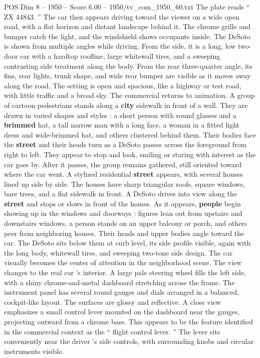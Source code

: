 \begin{textsample}{POS Dim 8 – 1950 – Score 6.00 – 1950/tv\_com\_1950\_60.txt}
The plate reads “ ZX 44843. ” The car then appears driving toward the viewer on a wide open road, with a flat horizon and distant landscape behind it.
The chrome grille and bumper catch the light, and the windshield shows occupants inside.
The DeSoto is shown from multiple angles while driving.
From the side, it is a long, low two-door car with a hardtop roofline, large whitewall tires, and a sweeping contrasting side treatment along the body.
From the rear three-quarter angle, its fins, rear lights, trunk shape, and wide rear bumper are visible as it moves away along the road.
The setting is open and spacious, like a highway or test road, with little traffic and a broad sky.
The commercial returns to animation.
A group of cartoon pedestrians stands along a \textbf{city} sidewalk in front of a wall.
They are drawn in varied shapes and styles : a short person with round glasses and a \textbf{brimmed} hat, a tall narrow man with a long face, a woman in a fitted light dress and wide-brimmed hat, and others clustered behind them.
Their bodies face the \textbf{street} and their heads turn as a DeSoto passes across the foreground from right to left.
They appear to stop and look, smiling or staring with interest as the car goes by.
After it passes, the group remains gathered, still oriented toward where the car went.
A stylized residential \textbf{street} appears, with several houses lined up side by side.
The houses have sharp triangular roofs, square windows, bare trees, and a flat sidewalk in front.
A DeSoto drives into view along the \textbf{street} and stops or slows in front of the homes.
As it appears, \textbf{people} begin showing up in the windows and doorways : figures lean out from upstairs and downstairs windows, a person stands on an upper balcony or porch, and others peer from neighboring houses.
Their heads and upper bodies angle toward the car.
The DeSoto sits below them at curb level, its side profile visible, again with the long body, whitewall tires, and sweeping two-tone side design.
The car visually becomes the center of attention in the neighborhood scene.
The view changes to the real car ’s interior.
A large pale steering wheel fills the left side, with a shiny chrome-and-metal dashboard stretching across the frame.
The instrument panel has several round gauges and dials arranged in a balanced, cockpit-like layout.
The surfaces are glossy and reflective.
A close view emphasizes a small control lever mounted on the dashboard near the gauges, projecting outward from a chrome base.
This appears to be the feature identified in the commercial context as the “ flight control lever. ” The lever sits conveniently near the driver ’s side controls, with surrounding knobs and circular instruments visible.

\end{textsample}
